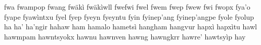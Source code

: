 fwa\hspace{2mm}
fwampop\hspace{2mm}
fwang\hspace{2mm}
fwäkì\hspace{2mm}
fwäkìwll\hspace{2mm}
fwefwi\hspace{2mm}
fwel\hspace{2mm}
fwem\hspace{2mm}
fwep\hspace{2mm}
fwew\hspace{2mm}
fwi\hspace{2mm}
fwopx\hspace{2mm}
fya'o\hspace{2mm}
fyape\hspace{2mm}
fyawìntxu\hspace{2mm}
fyel\hspace{2mm}
fyep\hspace{2mm}
fyeyn\hspace{2mm}
fyeyntu\hspace{2mm}
fyin\hspace{2mm}
fyinep'ang\hspace{2mm}
fyinep'angpe\hspace{2mm}
fyole\hspace{2mm}
fyolup\hspace{2mm}
ha\hspace{2mm}
ha'\hspace{2mm}
ha'ngir\hspace{2mm}
hahaw\hspace{2mm}
ham\hspace{2mm}
hamalo\hspace{2mm}
hametsì\hspace{2mm}
hangham\hspace{2mm}
hangvur\hspace{2mm}
hapxì\hspace{2mm}
hapxìtu\hspace{2mm}
hawl\hspace{2mm}
hawmpam\hspace{2mm}
hawntsyokx\hspace{2mm}
hawnu\hspace{2mm}
hawnven\hspace{2mm}
hawng\hspace{2mm}
hawngkrr\hspace{2mm}
hawre'\hspace{2mm}
hawtsyìp\hspace{2mm}
hay\hspace{2mm}
